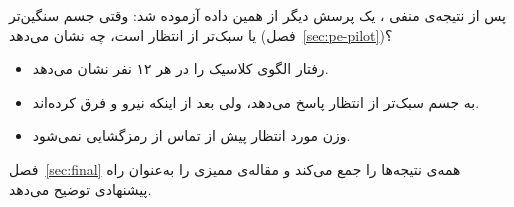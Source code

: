 پس از نتیجه‌ی منفی ، یک پرسش دیگر از همین داده آزموده شد: وقتی جسم سنگین‌تر یا سبک‌تر از انتظار است،  چه نشان می‌دهد (فصل~\ref{sec:pe-pilot})؟
\begin{itemize}
\item رفتار الگوی کلاسیک را در هر ۱۲ نفر نشان می‌دهد.
\item {} به جسم سبک‌تر از انتظار پاسخ می‌دهد، ولی بعد از اینکه نیرو و  فرق کرده‌اند.
\item وزن مورد انتظار پیش از تماس از  رمزگشایی نمی‌شود.
\end{itemize}
فصل~\ref{sec:final} همه‌ی نتیجه‌ها را جمع می‌کند و مقاله‌ی ممیزی را به‌عنوان راه پیشنهادی توضیح می‌دهد.

\newpage
